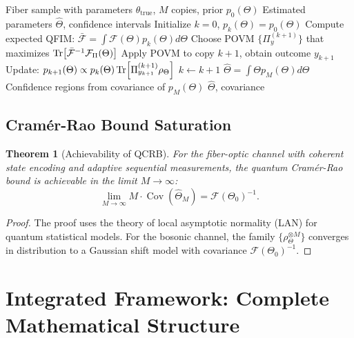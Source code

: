 \documentclass[12pt]{article}
\newtheorem{theorem}{Theorem}[section]
\newcommand{\Cov}{\operatorname{Cov}}
\begin{document}
\begin{algorithm}[H]
\caption{Channel Parameter Estimation Protocol}
\begin{algorithmic}[1]
\REQUIRE Fiber sample with parameters \(\theta_{\text{true}}\), \(M\) copies, prior \(p_0(\Theta)\)
\ENSURE Estimated parameters \(\hat{\Theta}\), confidence intervals
\STATE Initialize \(k = 0\), \(p_k(\Theta) = p_0(\Theta)\)
    \STATE Compute expected QFIM: \(\bar{\mathcal{F}} = \int \mathcal{F}(\Theta) p_k(\Theta) d\Theta\)
    \STATE Choose POVM \(\{\Pi_y^{(k+1)}\}\) that maximizes \(\Tr[\bar{\mathcal{F}}^{-1} \mathcal{F}_{\Pi}(\Theta)]\)
    \STATE Apply POVM to copy \(k+1\), obtain outcome \(y_{k+1}\)
    \STATE Update: \(p_{k+1}(\Theta) \propto p_k(\Theta) \Tr[\Pi_{y_{k+1}}^{(k+1)} \rho_\Theta]\)
    \STATE \(k \leftarrow k+1\)
\ENDWHILE
\STATE \(\hat{\Theta} = \int \Theta p_M(\Theta) d\Theta\)
\STATE Confidence regions from covariance of \(p_M(\Theta)\)
\RETURN \(\hat{\Theta}\), covariance
\end{algorithmic}
\end{algorithm}

\subsection{Cram\'er-Rao Bound Saturation}

\begin{theorem}[Achievability of QCRB]
For the fiber-optic channel with coherent state encoding and adaptive sequential measurements, the quantum Cram\'er-Rao bound is achievable in the limit \(M \to \infty\):
\begin{equation}
    \lim_{M\to\infty} M \cdot \Cov(\hat{\Theta}_M) = \mathcal{F}(\Theta_0)^{-1}.
\end{equation}
\end{theorem}

\begin{proof}
The proof uses the theory of local asymptotic normality (LAN) for quantum statistical models. For the bosonic channel, the family \(\{\rho_\Theta^{\otimes M}\}\) converges in distribution to a Gaussian shift model with covariance \(\mathcal{F}(\Theta_0)^{-1}\).
\end{proof}

\section{Integrated Framework: Complete Mathematical Structure}
\end{document}
